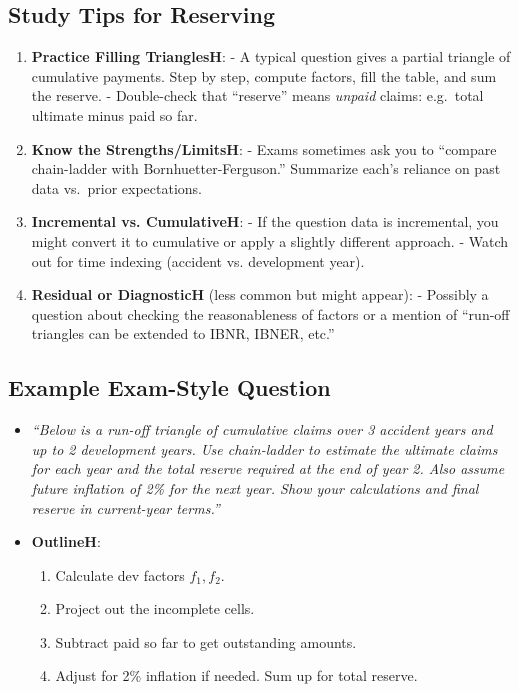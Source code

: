 \documentclass[13pt,a4paper]{article}
\begin{document}
\subsection{Study Tips for Reserving}
\begin{enumerate}
  \item \textbf{Practice Filling TrianglesH}: 
    - A typical question gives a partial triangle of cumulative payments. Step by step, compute factors, fill the table, and sum the reserve. 
    - Double-check that “reserve” means \emph{unpaid} claims: e.g.\ total ultimate minus paid so far.
  \item \textbf{Know the Strengths/LimitsH}: 
    - Exams sometimes ask you to “compare chain-ladder with Bornhuetter-Ferguson.” Summarize each’s reliance on past data vs.\ prior expectations.
  \item \textbf{Incremental vs. CumulativeH}:
    - If the question data is incremental, you might convert it to cumulative or apply a slightly different approach.  
    - Watch out for time indexing (accident vs. development year).
  \item \textbf{Residual or DiagnosticH} (less common but might appear): 
    - Possibly a question about checking the reasonableness of factors or a mention of “run-off triangles can be extended to IBNR, IBNER, etc.”
\end{enumerate}

\subsection{Example Exam-Style Question}
\begin{itemize}
  \item \emph{“Below is a run-off triangle of cumulative claims over 3 accident years and up to 2 development years. Use chain-ladder to estimate the ultimate claims for each year and the total reserve required at the end of year 2. Also assume future inflation of 2\% for the next year. Show your calculations and final reserve in current-year terms.”}
  \item \textbf{OutlineH}:
    \begin{enumerate}
      \item Calculate dev factors \(f_1, f_2\).  
      \item Project out the incomplete cells.  
      \item Subtract paid so far to get outstanding amounts.  
      \item Adjust for 2\% inflation if needed. Sum up for total reserve.
    \end{enumerate}
\end{itemize}
\end{document}
